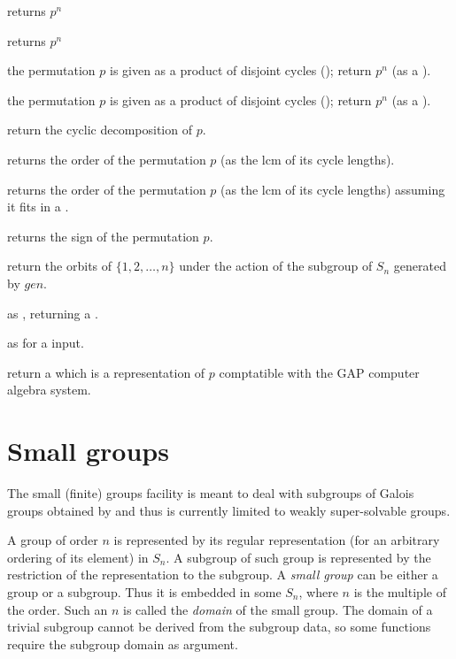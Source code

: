  returns $p^n$

 returns $p^n$

 the permutation $p$ is given as
a product of disjoint cycles (); return $p^n$ (as a ).

 the permutation $p$ is given as
a product of disjoint cycles (); return $p^n$ (as a ).

 return the cyclic decomposition of $p$.

 returns the order of the permutation $p$
(as the lcm of its cycle lengths).

 returns the order of the permutation $p$
(as the lcm of its cycle lengths) assuming it fits in a .

 returns the sign of the permutation $p$.

 return the orbits of
$\{1,2,\ldots,n\}$ under the action of the subgroup of $S_n$ generated by
$gen$.

 as , returning a
.

 as  for a  input.

 return a  which is a representation
of $p$ comptatible with the GAP computer algebra system.

\section{Small groups}

The small (finite) groups facility is meant to deal with subgroups of Galois
groups obtained by  and thus is currently limited to weakly
super-solvable groups.

A group  of order $n$ is represented by its regular representation
(for an arbitrary ordering of its element) in $S_n$.  A subgroup of such group
is represented by the restriction of the representation to the subgroup.
A \emph{small group} can be either a group or a subgroup. Thus it is embedded
in some $S_n$, where $n$ is the multiple of the order. Such an $n$ is called
the \emph{domain} of the small group. The domain of a trivial subgroup cannot
be derived from the subgroup data, so some functions require the subgroup
domain as argument.

